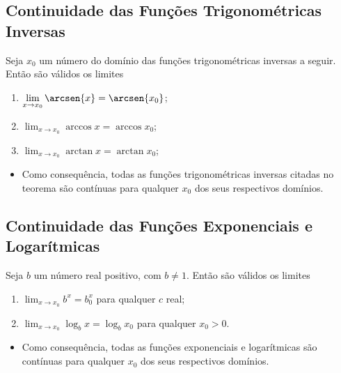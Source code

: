 \subsection{Continuidade das Funções Trigonométricas Inversas}
\begin{frame}
  \begin{theorem}
    Seja $x_{0}$ um número do domínio das funções trigonométricas inversas a seguir. Então são válidos os limites
    \begin{enumerate}
      \item $\displaystyle\lim_{x\to x_{0}}{\arcsen{x}} = \arcsen{x_{0}}$;
      \item $\displaystyle\lim_{x\to x_{0}}{\arccos{x}} = \arccos{x_{0}}$;
      \item $\displaystyle\lim_{x\to x_{0}}{\arctan{x}} = \arctan{x_{0}}$;
    \end{enumerate}
  \end{theorem}
  \begin{itemize}
    \item Como consequência, todas as funções trigonométricas inversas citadas no teorema são contínuas para qualquer $x_{0}$ dos seus respectivos domínios.
  \end{itemize}
\end{frame}

\subsection{Continuidade das Funções Exponenciais e Logarítmicas}
\begin{frame}
  \begin{theorem}
    Seja $b$ um número real positivo, com $b\not=1$. Então são válidos os limites
    \begin{enumerate}
      \item $\lim_{x\to x_{0}}{b^x}=b^x_{0}$ para qualquer $c$ real;
      \item $\displaystyle\lim_{x\to x_{0}}{\log_{b}{x}}=\log_{b}{x_{0}}$ para qualquer $x_{0} > 0$.
    \end{enumerate}
  \end{theorem}
  \begin{itemize}
    \item Como consequência, todas as funções exponenciais e logarítmicas são contínuas para qualquer $x_{0}$ dos seus respectivos domínios.
  \end{itemize}
\end{frame}

